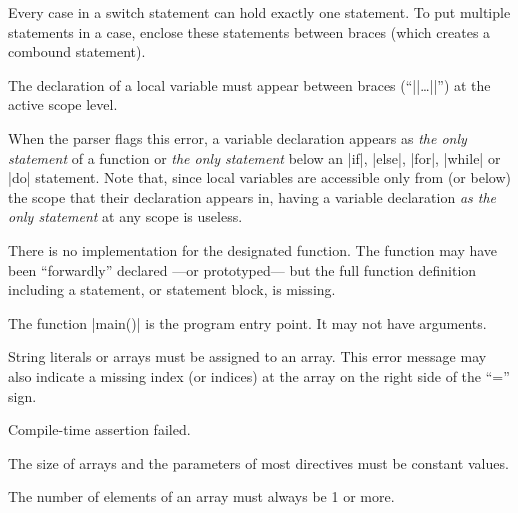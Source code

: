 { %
        Every case in a switch statement can hold exactly one statement. To
        put multiple statements in a case, enclose these statements between
        braces (which creates a combound statement).

 
        The declaration of a local variable must appear between braces (``|{|\dots|}|'')
        at the active scope level.

        When the parser flags this error, a variable declaration appears as
        {\it the only statement\/} of a function or {\it the only statement\/}
        below an |if|, |else|, |for|, |while| or |do| statement. Note that, since
        local variables are accessible only from (or below) the scope that their
        declaration appears in, having a variable declaration {\it as the only statement\/}
        at any scope is useless.

        There is no implementation for the designated
        function. The function may have been ``forwardly'' declared ---or
        prototyped--- but the full function definition including a statement,
        or statement block, is missing.

 
        The function |main()| is the program entry point. It may not have
        arguments.

 
        String literals or arrays must be assigned to an array. This error
        message may also indicate a missing index (or indices) at the array
        on the right side of the ``='' sign.

        Compile-time assertion failed.

 
        The size of arrays and the parameters of most directives must be
        constant values.

 
        The number of elements of an array must always be 1 or more.

}
